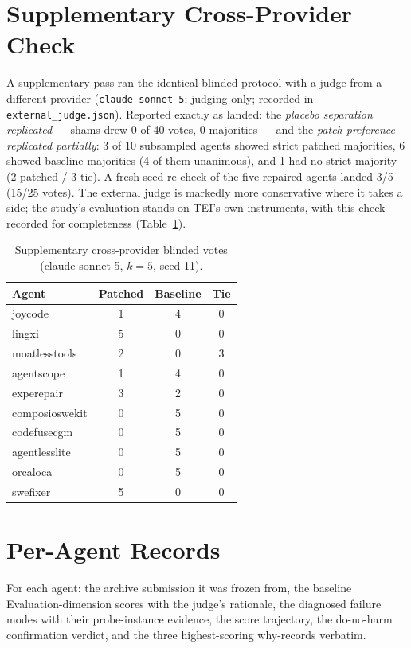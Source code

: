 \section{Supplementary Cross-Provider Check}
\label{app:ext}
A supplementary pass ran the identical blinded protocol with a judge from a
different provider (\texttt{claude-sonnet-5}; judging only; recorded in
\texttt{external\_judge.json}). Reported exactly as landed: the \emph{placebo
separation replicated} --- shams drew 0 of 40 votes, 0 majorities --- and the
\emph{patch preference replicated partially}: 3 of 10 subsampled agents showed
strict patched majorities, 6 showed baseline majorities (4 of them unanimous),
and 1 had no strict majority (2 patched / 3 tie). A fresh-seed re-check of the
five repaired agents landed 3/5 (15/25 votes). The external judge is markedly
more conservative where it takes a side; the study's evaluation stands on
TEI's own instruments, with this check recorded for completeness
(Table~\ref{tab:ext}).

\begin{table}[H]\centering
\caption{Supplementary cross-provider blinded votes (claude-sonnet-5, $k{=}5$, seed 11).}
\label{tab:ext}\footnotesize
\begin{tabular}{lccc}\toprule Agent & Patched & Baseline & Tie \\ \midrule
joycode & 1 & 4 & 0 \\
lingxi & 5 & 0 & 0 \\
moatlesstools & 2 & 0 & 3 \\
agentscope & 1 & 4 & 0 \\
experepair & 3 & 2 & 0 \\
composioswekit & 0 & 5 & 0 \\
codefusecgm & 0 & 5 & 0 \\
agentlesslite & 0 & 5 & 0 \\
orcaloca & 0 & 5 & 0 \\
swefixer & 5 & 0 & 0 \\
\bottomrule\end{tabular}\end{table}

\clearpage
\section{Per-Agent Records}
\label{app:agents}
For each agent: the archive submission it was frozen from, the baseline
Evaluation-dimension scores with the judge's rationale, the diagnosed failure
modes with their probe-instance evidence, the score trajectory, the do-no-harm
confirmation verdict, and the three highest-scoring why-records verbatim.

